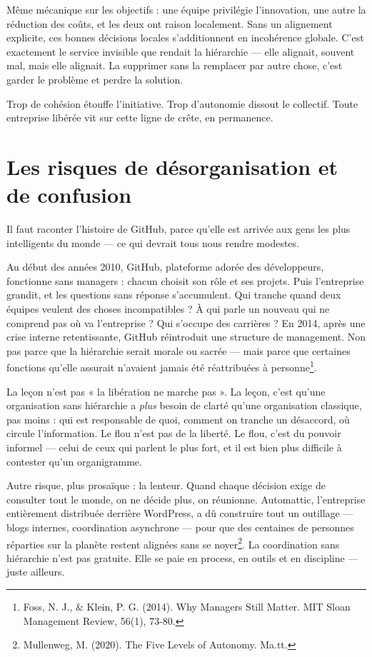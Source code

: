 Même mécanique sur les objectifs : une équipe privilégie l'innovation, une autre la réduction des coûts, et les deux ont raison localement. Sans un alignement explicite, ces bonnes décisions locales s'additionnent en incohérence globale. C'est exactement le service invisible que rendait la hiérarchie — elle alignait, souvent mal, mais elle alignait. La supprimer sans la remplacer par autre chose, c'est garder le problème et perdre la solution.

Trop de cohésion étouffe l'initiative. Trop d'autonomie dissout le collectif. Toute entreprise libérée vit sur cette ligne de crête, en permanence.

\section{Les risques de désorganisation et de confusion}

Il faut raconter l'histoire de GitHub, parce qu'elle est arrivée aux gens les plus intelligents du monde — ce qui devrait tous nous rendre modestes.

Au début des années 2010, GitHub, plateforme adorée des développeurs, fonctionne sans managers : chacun choisit son rôle et ses projets. Puis l'entreprise grandit, et les questions sans réponse s'accumulent. Qui tranche quand deux équipes veulent des choses incompatibles ? À qui parle un nouveau qui ne comprend pas où va l'entreprise ? Qui s'occupe des carrières ? En 2014, après une crise interne retentissante, GitHub réintroduit une structure de management. Non pas parce que la hiérarchie serait morale ou sacrée — mais parce que certaines fonctions qu'elle assurait n'avaient jamais été réattribuées à personne\footnote{Foss, N. J., \& Klein, P. G. (2014). Why Managers Still Matter. MIT Sloan Management Review, 56(1), 73-80.}.

La leçon n'est pas « la libération ne marche pas ». La leçon, c'est qu'une organisation sans hiérarchie a \emph{plus} besoin de clarté qu'une organisation classique, pas moins : qui est responsable de quoi, comment on tranche un désaccord, où circule l'information. Le flou n'est pas de la liberté. Le flou, c'est du pouvoir informel — celui de ceux qui parlent le plus fort, et il est bien plus difficile à contester qu'un organigramme.

Autre risque, plus prosaïque : la lenteur. Quand chaque décision exige de consulter tout le monde, on ne décide plus, on réunionne. Automattic, l'entreprise entièrement distribuée derrière WordPress, a dû construire tout un outillage — blogs internes, coordination asynchrone — pour que des centaines de personnes réparties sur la planète restent alignées sans se noyer\footnote{Mullenweg, M. (2020). The Five Levels of Autonomy. Ma.tt.}. La coordination sans hiérarchie n'est pas gratuite. Elle se paie en process, en outils et en discipline — juste ailleurs.

